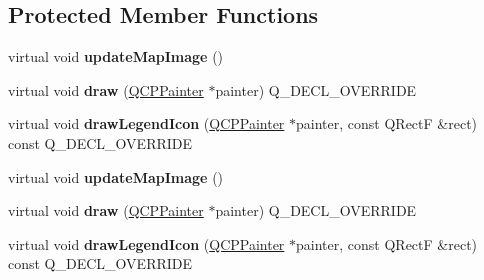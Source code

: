 \subsection*{Protected Member Functions}
\begin{DoxyCompactItemize}
\item 
virtual void {\bfseries update\+Map\+Image} ()\hypertarget{class_q_c_p_color_map_a5efcea591bb5486d968af520a4d43c3a}{}\label{class_q_c_p_color_map_a5efcea591bb5486d968af520a4d43c3a}

\item 
virtual void {\bfseries draw} (\hyperlink{class_q_c_p_painter}{Q\+C\+P\+Painter} $\ast$painter) Q\+\_\+\+D\+E\+C\+L\+\_\+\+O\+V\+E\+R\+R\+I\+DE\hypertarget{class_q_c_p_color_map_a6b628014d2939368935efd0a788648c8}{}\label{class_q_c_p_color_map_a6b628014d2939368935efd0a788648c8}

\item 
virtual void {\bfseries draw\+Legend\+Icon} (\hyperlink{class_q_c_p_painter}{Q\+C\+P\+Painter} $\ast$painter, const Q\+RectF \&rect) const Q\+\_\+\+D\+E\+C\+L\+\_\+\+O\+V\+E\+R\+R\+I\+DE\hypertarget{class_q_c_p_color_map_adeaa5e262a03b7f021bd1aa6f1e60ce9}{}\label{class_q_c_p_color_map_adeaa5e262a03b7f021bd1aa6f1e60ce9}

\item 
virtual void {\bfseries update\+Map\+Image} ()\hypertarget{class_q_c_p_color_map_a4925b3ad3bae1eb7e99f3b4496e80552}{}\label{class_q_c_p_color_map_a4925b3ad3bae1eb7e99f3b4496e80552}

\item 
virtual void {\bfseries draw} (\hyperlink{class_q_c_p_painter}{Q\+C\+P\+Painter} $\ast$painter) Q\+\_\+\+D\+E\+C\+L\+\_\+\+O\+V\+E\+R\+R\+I\+DE\hypertarget{class_q_c_p_color_map_a9341bb24e8d4e25cf57f7b60c5b98236}{}\label{class_q_c_p_color_map_a9341bb24e8d4e25cf57f7b60c5b98236}

\item 
virtual void {\bfseries draw\+Legend\+Icon} (\hyperlink{class_q_c_p_painter}{Q\+C\+P\+Painter} $\ast$painter, const Q\+RectF \&rect) const Q\+\_\+\+D\+E\+C\+L\+\_\+\+O\+V\+E\+R\+R\+I\+DE\hypertarget{class_q_c_p_color_map_aac08a04fceed57618440d9cde4527ab1}{}\label{class_q_c_p_color_map_aac08a04fceed57618440d9cde4527ab1}

\end{DoxyCompactItemize}
